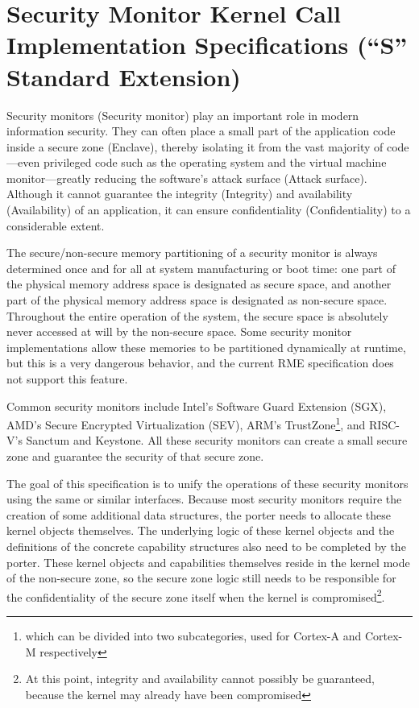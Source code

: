 \section{Security Monitor Kernel Call Implementation Specifications (``S'' Standard Extension)}\label{sec:8-security-monitor-kernel-calls}

Security monitors (Security
monitor) play an important role in modern information security. They can often place a small part of the application code inside a secure zone (Enclave), thereby isolating it from the vast majority of code---even privileged code such as the operating system and the virtual machine monitor---greatly reducing the software's attack surface (Attack
surface). Although it cannot guarantee the integrity (Integrity) and availability (Availability) of an application, it can ensure confidentiality (Confidentiality) to a considerable extent.

The secure/non-secure memory partitioning of a security monitor is always determined once and for all at system manufacturing or boot time: one part of the physical memory address space is designated as secure space, and another part of the physical memory address space is designated as non-secure space. Throughout the entire operation of the system, the secure space is absolutely never accessed at will by the non-secure space. Some security monitor implementations allow these memories to be partitioned dynamically at runtime, but this is a very dangerous behavior, and the current RME specification does not support this feature.

Common security monitors include Intel's Software Guard Extension (SGX), AMD's Secure Encrypted Virtualization (SEV), ARM's TrustZone\footnote{which can be divided into two subcategories, used for Cortex-A and Cortex-M respectively}, and RISC-V's Sanctum and Keystone. All these security monitors can create a small secure zone and guarantee the security of that secure zone.

The goal of this specification is to unify the operations of these security monitors using the same or similar interfaces. Because most security monitors require the creation of some additional data structures, the porter needs to allocate these kernel objects themselves. The underlying logic of these kernel objects and the definitions of the concrete capability structures also need to be completed by the porter. These kernel objects and capabilities themselves reside in the kernel mode of the non-secure zone, so the secure zone logic still needs to be responsible for the confidentiality of the secure zone itself when the kernel is compromised\footnote{At this point, integrity and availability cannot possibly be guaranteed, because the kernel may already have been compromised}.

